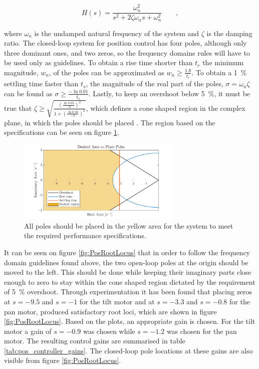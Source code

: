 \documentclass[../../main.tex]{subfiles}
\begin{document}
\begin{equation} \label{eq:basic_second_order_tf}
    H(s) = \frac{\omega_n^2}{s^2 + 2\zeta \omega_n s + \omega_n^2} \qquad ,
\end{equation}

where $\omega_{n}$ is the undamped natural frequency of the system and $\zeta$ is the damping ratio. 
The closed-loop system for position control has four poles, although only three dominant ones, and two zeros, so the frequency domains rules will have to be used only as guidelines. To obtain a rise time shorter than $t_r$ the minimum magnitude, $w_n$, of the poles can be approximated as $w_n\geq\frac{1.8}{t_r}$. To obtain a \SI{1}{\percent} settling time faster than $t_s$, the magnitude of the real part of the poles, $\sigma = \omega_n \zeta$ can be found as $\sigma \geq \frac{-\ln{0.01}}{t_s} $. Lastly, to keep an overshoot below \SI{5}{\percent}, it must be true that $\zeta \geq \sqrt{\frac{(\frac{\ln{0.05}}{-\pi})^2}{1+(\frac{\ln{0.05}}{-\pi})^2}}$, which defines a cone shaped region in the complex plane, in which the poles should be placed \cite{}. The region based on the specifications can be seen on figure \ref{fig:system_requirements}.


\begin{figure}
    \centering
    \includegraphics[width=0.7\textwidth]{Sections/System_Design/Images/system_requirements_new.png}
    \caption{All poles should be placed in the yellow area for the system to meet the required performance specifications.}
    \label{fig:system_requirements}
\end{figure}

It can be seen on figure \ref{fig:PosRootLocus} that in order to follow the frequency domain guidelines found above, the two open-loop poles at the origin should be moved to the left. This should be done while keeping their imaginary parts close enough to zero to stay within the cone shaped region dictated by the requirement of \SI{5}{\percent} overshoot.
Through experimentation it has been found that placing zeros at $s=-9.5$ and $s=-1$ for the tilt motor and at $s=-3.3$ and $s=-0.8$ for the pan motor, produced satisfactory root loci, which are shown in figure \ref{fig:PosRootLocus}. Based on the plots, an appropriate gain is chosen. For the tilt motor a gain of $s=-0.9$ was chosen while $s=-1.2$ was chosen for the pan motor. The resulting control gains are summarised in table \ref{tab:pos_controller_gains}. The closed-loop pole locations at these gains are also visible from figure \ref{fig:PosRootLocus}.
\end{document}
